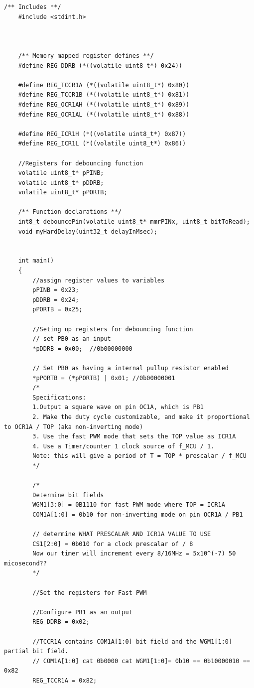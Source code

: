 \documentclass[11pt,pdftex,portrait,letterpaper]{article}
\begin{document}
	\begin{lstlisting}[caption={Program 1}, label=l:programx]
	/** Includes **/
	#include <stdint.h>

	
	
	/** Memory mapped register defines **/
	#define REG_DDRB (*((volatile uint8_t*) 0x24))
	
	#define REG_TCCR1A (*((volatile uint8_t*) 0x80))
	#define REG_TCCR1B (*((volatile uint8_t*) 0x81))
	#define REG_OCR1AH (*((volatile uint8_t*) 0x89))
	#define REG_OCR1AL (*((volatile uint8_t*) 0x88))
	
	#define REG_ICR1H (*((volatile uint8_t*) 0x87))
	#define REG_ICR1L (*((volatile uint8_t*) 0x86))
	
	//Registers for debouncing function
	volatile uint8_t* pPINB;
	volatile uint8_t* pDDRB;
	volatile uint8_t* pPORTB;
	
	/** Function declarations **/
	int8_t debouncePin(volatile uint8_t* mmrPINx, uint8_t bitToRead);
	void myHardDelay(uint32_t delayInMsec);
	
	
	int main()
	{
		//assign register values to variables
		pPINB = 0x23;
		pDDRB = 0x24;
		pPORTB = 0x25;
		
		//Seting up registers for debouncing function
		// set PB0 as an input
		*pDDRB = 0x00;  //0b00000000
		
		// Set PB0 as having a internal pullup resistor enabled
		*pPORTB = (*pPORTB) | 0x01; //0b00000001
		/*
		Specifications:
		1.Output a square wave on pin OC1A, which is PB1
		2. Make the duty cycle customizable, and make it proportional to OCR1A / TOP (aka non-inverting mode)
		3. Use the fast PWM mode that sets the TOP value as ICR1A
		4. Use a Timer/counter 1 clock source of f_MCU / 1.
		Note: this will give a period of T = TOP * prescalar / f_MCU
		*/
		
		/*
		Determine bit fields
		WGM1[3:0] = 0B1110 for fast PWM mode where TOP = ICR1A 
		COM1A[1:0] = 0b10 for non-inverting mode on pin OCR1A / PB1
		
		// determine WHAT PRESCALAR AND ICR1A VALUE TO USE
		CS1[2:0] = 0b010 for a clock prescalar of / 8 
		Now our timer will increment every 8/16MHz = 5x10^(-7) 50 micosecond??
		*/
		
		//Set the registers for Fast PWM
		
		//Configure PB1 as an output
		REG_DDRB = 0x02;
		
		//TCCR1A contains COM1A[1:0] bit field and the WGM1[1:0] partial bit field.
		// COM1A[1:0] cat 0b0000 cat WGM1[1:0]= 0b10 == 0b10000010 == 0x82
		REG_TCCR1A = 0x82;
		

\end{lstlisting}
\end{document}
